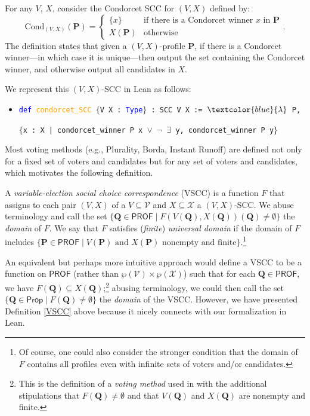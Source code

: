 \documentclass[runningheads]{llncs}
\begin{document}
\begin{example}\label{CondorcetEx1} For any $V$, $X$, consider the Condorcet SCC for $(V,X)$ defined by:
\[\mathrm{Cond}_{(V,X)}(\mathbf{P})=\begin{cases} \{x\} & \mbox{if there is a Condorcet winner $x$ in $\mathbf{P}$} \\ X(\mathbf{P}) & \mbox{otherwise}\end{cases}.\]
The definition states that given a $(V,X)$-profile $\mathbf{P}$, if there is a Condorcet winner---in which case it is unique---then output the set containing the Condorcet winner, and otherwise output all candidates in $X$.

We represent this $(V,X)$-SCC in Lean as follows:
\begin{itemize}
\item[] \texttt{\textcolor{blue}{def} \textcolor{orange}{condorcet\_SCC} $\{$V X : \textcolor{blue}{Type}$\}$ : SCC V X := $\textcolor{blue}{\lambda}$ P, }

\texttt{$\{$x : X |  condorcet\_winner P x $\vee$ $\neg$ $\exists$ y, condorcet\_winner P y$\}$}
\end{itemize}
\end{example}

Most voting methods (e.g., Plurality, Borda, Instant Runoff) are defined not only for a fixed set of voters and candidates but for any set of voters and candidates, which motivates the following definition.

\begin{definition}\label{VSCC} \textnormal{A \textit{variable-election social choice correspondence} (VSCC) is a function $F$ that assigns to each pair $(V,X)$ of a $V\subseteq \mathcal{V}$ and $X\subseteq\mathcal{X}$ a $(V,X)$-SCC. We abuse terminology and call the set $\{\mathbf{Q}\in\mathsf{PROF}\mid F(V(\mathbf{Q}),X(\mathbf{Q}))(\mathbf{Q})\neq\emptyset \}$ the \textit{domain} of  $F$. We say that $F$ satisfies  (\textit{finite}) \textit{universal domain} if the domain of $F$ includes $\{\mathbf{P}\in \mathsf{PROF}\mid V(\mathbf{P}) \mbox{ and }X(\mathbf{P}) \mbox{ nonempty and finite}\}$.}\footnote{Of course, one could also consider the stronger condition that the domain of $F$ contains all profiles even with infinite sets of voters and/or candidates.}
\end{definition}

\noindent An equivalent but perhaps more intuitive approach would define a VSCC to be a function on $\mathsf{PROF}$ (rather than $\wp(\mathcal{V})\times\wp(\mathcal{X})$) such that for each $\mathbf{Q}\in\mathsf{PROF}$, we have $F(\mathbf{Q})\subseteq X(\mathbf{Q})$;\footnote{This is the definition of a \textit{voting method} used in \cite{HP2020b} with the additional stipulations that $F(\mathbf{Q})\neq\emptyset$ and  that $V(\mathbf{Q})$ and $X(\mathbf{Q})$ are nonempty and finite.} abusing terminology, we could then call the set $\{\mathbf{Q}\in\mathsf{Prop}\mid F(\mathbf{Q})\neq\emptyset\}$ the \emph{domain} of the VSCC. However, we have presented Definition \ref{VSCC} above because it nicely connects with our formalization in Lean.
\end{document}
